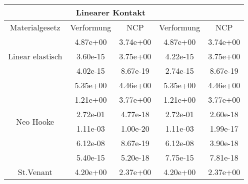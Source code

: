 \begin{table} 
\centering 
\begin{tabular}{c|cc|cc|} 
\cline{2-5} 
 & \multicolumn{2}{|c|}{Linearer Kontakt} &  \\ 
\hline 
\multicolumn{1}{|c|}{Materialgesetz} & \multicolumn{1}{c|}{Verformung} & \multicolumn{1}{c|}{NCP} & \multicolumn{1}{c|}{Verformung} & \multicolumn{1}{c|}{NCP} \\ 
\hline 
\multicolumn{1}{|c|}{\multirow{3}{*}{Linear elastisch}} &\multicolumn{1}{|c|}{  4.87e+00} & \multicolumn{1}{|c|}{  3.74e+00} & \multicolumn{1}{|c|}{  4.87e+00} & \multicolumn{1}{|c|}{  3.74e+00} \\ 
\multicolumn{1}{|c|}{} & \multicolumn{1}{|c|}{  3.60e-15} & \multicolumn{1}{|c|}{  3.75e+00} & \multicolumn{1}{|c|}{  4.22e-15} & \multicolumn{1}{|c|}{  3.75e+00} \\ 
\multicolumn{1}{|c|}{} & \multicolumn{1}{|c|}{  4.02e-15} & \multicolumn{1}{|c|}{  8.67e-19} & \multicolumn{1}{|c|}{  2.74e-15} & \multicolumn{1}{|c|}{  8.67e-19} \\ 
\hline 
\multicolumn{1}{|c|}{\multirow{6}{*}{Neo Hooke}} &\multicolumn{1}{|c|}{  5.35e+00} & \multicolumn{1}{|c|}{  4.46e+00} & \multicolumn{1}{|c|}{  5.35e+00} & \multicolumn{1}{|c|}{  4.46e+00} \\ 
\multicolumn{1}{|c|}{} & \multicolumn{1}{|c|}{  1.21e+00} & \multicolumn{1}{|c|}{  3.77e+00} & \multicolumn{1}{|c|}{  1.21e+00} & \multicolumn{1}{|c|}{  3.77e+00} \\ 
\multicolumn{1}{|c|}{} & \multicolumn{1}{|c|}{  2.72e-01} & \multicolumn{1}{|c|}{  4.77e-18} & \multicolumn{1}{|c|}{  2.72e-01} & \multicolumn{1}{|c|}{  2.60e-18} \\ 
\multicolumn{1}{|c|}{} & \multicolumn{1}{|c|}{  1.11e-03} & \multicolumn{1}{|c|}{  1.00e-20} & \multicolumn{1}{|c|}{  1.11e-03} & \multicolumn{1}{|c|}{  1.99e-17} \\ 
\multicolumn{1}{|c|}{} & \multicolumn{1}{|c|}{  6.12e-08} & \multicolumn{1}{|c|}{  8.67e-19} & \multicolumn{1}{|c|}{  6.12e-08} & \multicolumn{1}{|c|}{  3.90e-18} \\ 
\multicolumn{1}{|c|}{} & \multicolumn{1}{|c|}{  5.40e-15} & \multicolumn{1}{|c|}{  5.20e-18} & \multicolumn{1}{|c|}{  7.75e-15} & \multicolumn{1}{|c|}{  7.81e-18} \\ 
\hline 
\multicolumn{1}{|c|}{\multirow{7}{*}{St.Venant}} &\multicolumn{1}{|c|}{  4.20e+00} & \multicolumn{1}{|c|}{  2.37e+00} & \multicolumn{1}{|c|}{  4.20e+00} & \multicolumn{1}{|c|}{  2.37e+00} \\ 

\end{tabular}
\end{table}
